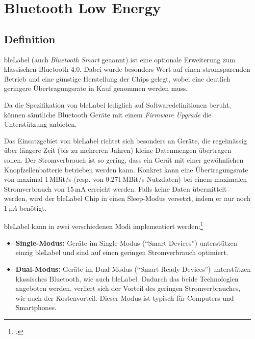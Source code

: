 \chapter{Bluetooth Low Energy}
\label{ch:ble}


\section{Definition}
\gls{bleLabel} (auch \textit{Bluetooth Smart} genannt) ist eine optionale Erweiterung zum klassischen Bluetooth 4.0.
Dabei wurde besonders Wert auf einen stromsparenden Betrieb und eine günstige Herstellung der Chips gelegt, wobei eine deutlich geringere Übertragungsrate in Kauf genommen werden muss.

Da die Spezifikation von \gls{bleLabel} lediglich auf Softwaredefinitionen beruht, können sämtliche Bluetooth Geräte mit einem \textit{Firmware Upgrade} die Unterstützung anbieten.

Das Einsatzgebiet von \gls{bleLabel} richtet sich besonders an Geräte, die regelmässig über längere Zeit (bis zu mehreren Jahren) kleine Datenmengen übertragen sollen.
Der Stromverbrauch ist so gering, dass ein Gerät mit einer gewöhnlichen Knopfzellenbatterie betrieben werden kann. Konkret kann eine Übertragungsrate von maximal 1\,MBit/s (resp. von 0.271\,MBit/s Nutzdaten) bei einem maximalen Stromverbrauch von 15\,mA erreicht werden.
Falls keine Daten übermittelt werden, wird der \gls{bleLabel} Chip in einen Sleep-Modus versetzt, indem er nur noch $1\,\si{\micro A}$ benötigt.

\gls{bleLabel} kann in zwei verschiedenen Modi implementiert werden:\footcite{Bluetooth_Low_Energy_vs_Classic_Bluetooth_Medical_Electronics_Design_2015-04-27}
\begin{itemize}
	\item \textbf{Single-Modus:} Geräte im Single-Modus ("`Smart Devices"') unterstützen einzig \gls{bleLabel} und sind auf einen geringen Stromverbrauch optimiert.
	\item \textbf{Dual-Modus:} Geräte im Dual-Modus ("`Smart Ready Devices"') unterstützen klassisches Bluetooth, wie auch \gls{bleLabel}. Dadurch das beide Technologien angeboten werden, verliert sich der Vorteil des geringen Stromverbrauches, wie auch der Kostenvorteil. Dieser Modus ist typisch für Computers und Smartphones.
\end{itemize}


